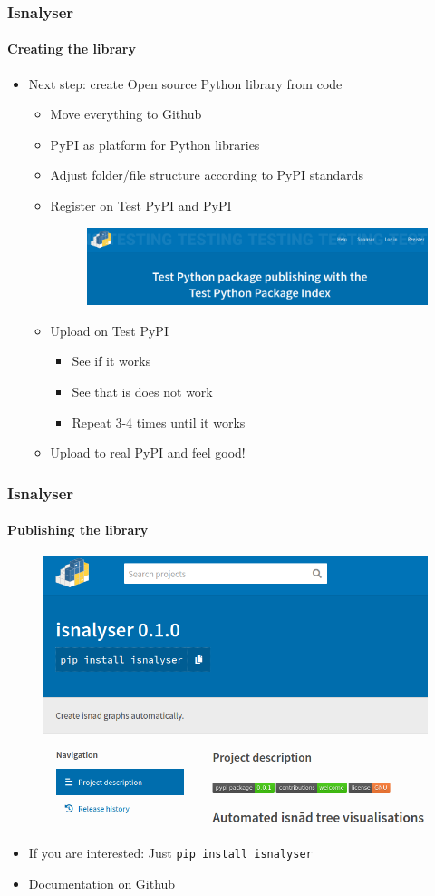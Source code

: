 \documentclass[9pt]{beamer}
\begin{document}
\begin{frame}
\frametitle{Isnalyser}
\framesubtitle{Creating the library}
\begin{itemize}%
		\item Next step: create Open source Python library from code 
		\begin{itemize}
			
	\item Move everything to Github%
	\item PyPI as platform for Python libraries
	\item Adjust folder/file structure according to PyPI standards
	\item Register on Test PyPI and PyPI
	\begin{figure}
		\flushleft
		\includegraphics[width=.6\linewidth]{figures/test_pypi.png}
	\end{figure}
	\item Upload on Test PyPI
	\begin{itemize}
		\item See if it works
		\item See that is does not work
		\item Repeat 3-4 times until it works
	\end{itemize}
	\item Upload to real PyPI and feel good!
\end{itemize}
		\end{itemize}
\end{frame} 


\begin{frame}
\frametitle{Isnalyser}
\framesubtitle{Publishing the library}
	\begin{figure}
	\flushleft
	\includegraphics[width=.6\linewidth]{figures/pypi.png}
\end{figure}
\begin{itemize}%
	\item If you are interested: Just \texttt{pip install isnalyser}
	\item Documentation on Github
\end{itemize}
\end{frame} 
\end{document}
